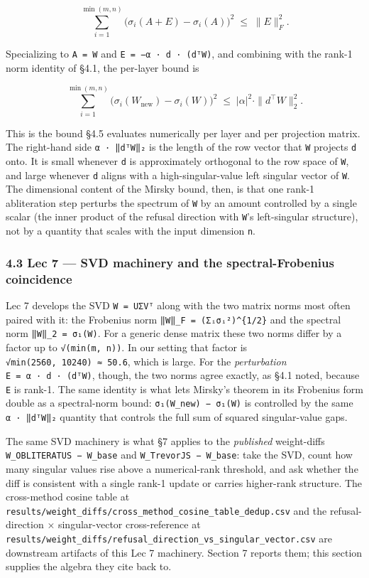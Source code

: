\documentclass[
  11pt,
]{article}
\begin{document}
\[ \sum_{i=1}^{\min(m, n)} \big(\sigma_{i}(A + E) - \sigma_{i}(A)\big)^{2} \;\le\; \|E\|_{F}^{2}. \]

Specializing to \texttt{A\ =\ W} and \texttt{E\ =\ −α\ ·\ d\ ·\ (dᵀW)},
and combining with the rank-1 norm identity of §4.1, the per-layer bound
is

\[ \sum_{i=1}^{\min(m, n)} \big(\sigma_{i}(W_{\text{new}}) - \sigma_{i}(W)\big)^{2} \;\le\; |\alpha|^{2} \cdot \|d^{\top} W\|_{2}^{2}. \]

This is the bound §4.5 evaluates numerically per layer and per
projection matrix. The right-hand side
\texttt{\textbar{}α\textbar{}\ ·\ ‖dᵀW‖₂} is the length of the row
vector that \texttt{W} projects \texttt{d} onto. It is small whenever
\texttt{d} is approximately orthogonal to the row space of \texttt{W},
and large whenever \texttt{d} aligns with a high-singular-value left
singular vector of \texttt{W}. The dimensional content of the Mirsky
bound, then, is that one rank-1 abliteration step perturbs the spectrum
of \texttt{W} by an amount controlled by a single scalar (the inner
product of the refusal direction with \texttt{W}'s left-singular
structure), not by a quantity that scales with the input dimension
\texttt{n}.

\subsubsection{4.3 Lec 7 --- SVD machinery and the spectral-Frobenius
coincidence}\label{lec-7-svd-machinery-and-the-spectral-frobenius-coincidence}

Lec 7 develops the SVD \texttt{W\ =\ UΣVᵀ} along with the two matrix
norms most often paired with it: the Frobenius norm
\texttt{‖W‖\_F\ =\ (Σᵢσᵢ²)\^{}\{1/2\}} and the spectral norm
\texttt{‖W‖\_2\ =\ σ₁(W)}. For a generic dense matrix these two norms
differ by a factor up to \texttt{√(min(m,\ n))}. In our setting that
factor is \texttt{√min(2560,\ 10240)\ ≈\ 50.6}, which is large. For the
\emph{perturbation} \texttt{E\ =\ α\ ·\ d\ ·\ (dᵀW)}, though, the two
norms agree exactly, as §4.1 noted, because \texttt{E} is rank-1. The
same identity is what lets Mirsky's theorem in its Frobenius form double
as a spectral-norm bound: \texttt{σ₁(W\_new)\ −\ σ₁(W)} is controlled by
the same \texttt{\textbar{}α\textbar{}\ ·\ ‖dᵀW‖₂} quantity that
controls the full sum of squared singular-value gaps.

The same SVD machinery is what §7 applies to the \emph{published}
weight-diffs \texttt{W\_OBLITERATUS\ −\ W\_base} and
\texttt{W\_TrevorJS\ −\ W\_base}: take the SVD, count how many singular
values rise above a numerical-rank threshold, and ask whether the diff
is consistent with a single rank-1 update or carries higher-rank
structure. The cross-method cosine table at
\texttt{results/weight\_diffs/cross\_method\_cosine\_table\_dedup.csv}
and the refusal-direction × singular-vector cross-reference at
\texttt{results/weight\_diffs/refusal\_direction\_vs\_singular\_vector.csv}
are downstream artifacts of this Lec 7 machinery. Section 7 reports
them; this section supplies the algebra they cite back to.
\end{document}
